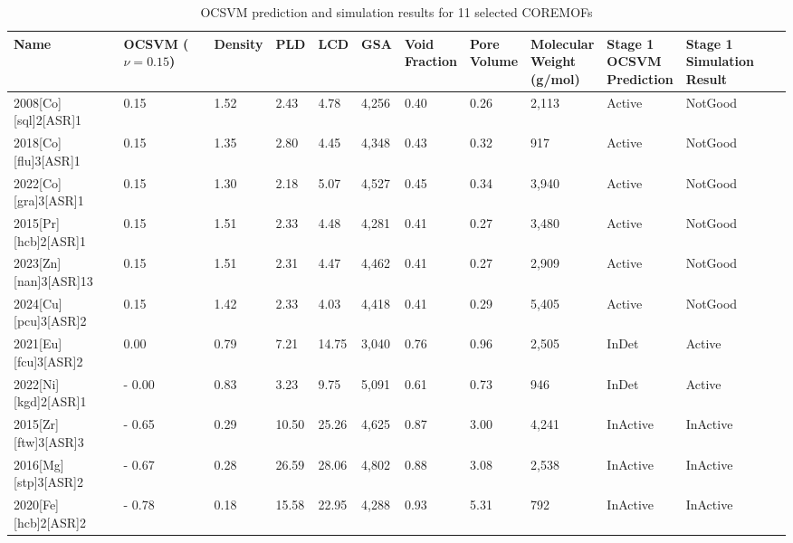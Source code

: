 \documentclass[twoside,twocolumn,9pt]{article}
\begin{document}
\begin{table}[t]
	\centering
	\begin{tabular}{@{}lllllllllllll@{}}
		\toprule
		\textbf{Name} &
		\makecell{\textbf{OCSVM}\\\textbf{($\nu=0.15$)}} &
		\textbf{Density} &
		\textbf{PLD} &
		\textbf{LCD} &
		\textbf{GSA} &
		\makecell{\textbf{Void}\\\textbf{Fraction}} &
		\makecell{\textbf{Pore}\\\textbf{Volume}} &
		\makecell{\textbf{Molecular}\\\textbf{Weight}\\\textbf{(g/mol)}} &
		\makecell{\textbf{Stage 1}\\\textbf{OCSVM}\\\textbf{Prediction}} &
		\makecell{\textbf{Stage 1}\\\textbf{Simulation}\\\textbf{Result}} \\
		\midrule
		2008{[}Co{]}{[}sql{]}2{[}ASR{]}1  & 0.15         & 1.52 & 2.43  & 4.78  & 4,256 & 0.40 & 0.26 & 2,113 & Active   & NotGood  \\
		2018{[}Co{]}{[}flu{]}3{[}ASR{]}1  & 0.15         & 1.35 & 2.80  & 4.45  & 4,348 & 0.43 & 0.32 & 917   & Active   & NotGood  \\
		2022{[}Co{]}{[}gra{]}3{[}ASR{]}1  & 0.15         & 1.30 & 2.18  & 5.07  & 4,527 & 0.45 & 0.34 & 3,940 & Active   & NotGood  \\
		2015{[}Pr{]}{[}hcb{]}2{[}ASR{]}1  & 0.15         & 1.51 & 2.33  & 4.48  & 4,281 & 0.41 & 0.27 & 3,480 & Active   & NotGood  \\
		2023{[}Zn{]}{[}nan{]}3{[}ASR{]}13 & 0.15         & 1.51 & 2.31  & 4.47  & 4,462 & 0.41 & 0.27 & 2,909 & Active   & NotGood  \\
		2024{[}Cu{]}{[}pcu{]}3{[}ASR{]}2  & 0.15         & 1.42 & 2.33  & 4.03  & 4,418 & 0.41 & 0.29 & 5,405 & Active   & NotGood  \\
		2021{[}Eu{]}{[}fcu{]}3{[}ASR{]}2  & 0.00         & 0.79 & 7.21  & 14.75 & 3,040 & 0.76 & 0.96 & 2,505 & InDet & Active   \\
		2022{[}Ni{]}{[}kgd{]}2{[}ASR{]}1  & -       0.00 & 0.83 & 3.23  & 9.75  & 5,091 & 0.61 & 0.73 & 946   & InDet & Active   \\
		2015{[}Zr{]}{[}ftw{]}3{[}ASR{]}3  & -       0.65 & 0.29 & 10.50 & 25.26 & 4,625 & 0.87 & 3.00 & 4,241 & InActive & InActive \\
		2016{[}Mg{]}{[}stp{]}3{[}ASR{]}2  & -       0.67 & 0.28 & 26.59 & 28.06 & 4,802 & 0.88 & 3.08 & 2,538 & InActive & InActive \\
		2020{[}Fe{]}{[}hcb{]}2{[}ASR{]}2  & -       0.78 & 0.18 & 15.58 & 22.95 & 4,288 & 0.93 & 5.31 & 792   & InActive & InActive \\ \bottomrule
	\end{tabular}
	\caption{OCSVM prediction and simulation results for 11 selected COREMOFs}
	\label{tab:OCSVM-result}
\end{table}
\end{document}
